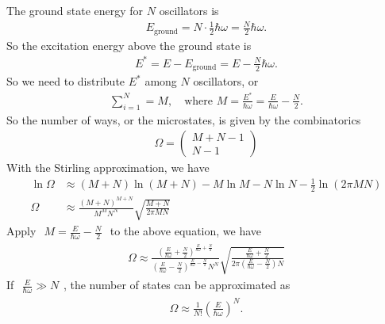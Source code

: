 \documentclass[../../main.tex]{subfiles}
\begin{document}
\begin{enumerate}
    The ground state energy for $N$ oscillators is
    \begin{align*}
      E_{\text{ground}} = N\cdot \frac{1}{2}\hbar\omega = \frac{N}{2}\hbar\omega.
    \end{align*}
    So the excitation energy above the ground state is
    \begin{align*}
      E^{*} = E - E_{\text{ground}} = E - \frac{N}{2}\hbar\omega.
    \end{align*}
    So we need to distribute $E^{*}$ among $N$ oscillators, or 
    \begin{align*}
      \sum_{i=1}^{N} = M,\quad \text{where } M = \frac{E^{*}}{\hbar\omega}  = \frac{E}{\hbar\omega} - \frac{N}{2}.
    \end{align*}
    So the number of ways, or the microstates, is given by the combinatorics
    \begin{align*}
      \Omega = \begin{pmatrix}
        M + N - 1 \\
        N - 1
      \end{pmatrix}
    \end{align*}
    With the Stirling approximation, we have
    \begin{align*}
      \ln{\Omega}&\approx (M + N)\ln{(M+N)} - M\ln{M} - N\ln{N} - \frac{1}{2}\ln{(2\pi MN)}\\
      \Omega &\approx \frac{(M+N)^{M+N}}{M^{M}N^{N}}\sqrt{\frac{M+N}{2\pi MN}}
    \end{align*}
    Apply $\begin{aligned}
      M = \frac{E}{\hbar\omega} - \frac{N}{2}
    \end{aligned}$ to the above equation, we have
    \begin{align*}
        \Omega\approx 
        \frac{(\frac{E}{\hbar\omega} + \frac{N}{2})^{\frac{E}{\hbar\omega} + \frac{N}{2}}}
        {(\frac{E}{\hbar\omega} - \frac{N}{2})^{\frac{E}{\hbar\omega} - \frac{N}{2}}N^{N}}
        \sqrt{\frac{\frac{E}{\hbar\omega} + \frac{N}{2}}{2\pi(\frac{E}{\hbar\omega} - \frac{N}{2})N}}
    \end{align*}
    If $\begin{aligned}
      \frac{E}{\hbar\omega}\gg N
    \end{aligned}$, the number of states can be approximated as
    \begin{align*}
      \Omega\approx \frac{1}{N!}\left(\frac{E}{\hbar\omega}\right)^{N}.
    \end{align*}


\end{enumerate}
\end{document}
